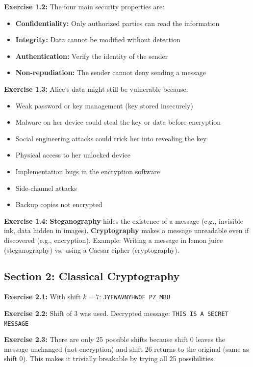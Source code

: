 \documentclass[11pt,a4paper]{report}
\begin{document}
\textbf{Exercise 1.2:}
The four main security properties are:
\begin{itemize}
    \item \textbf{Confidentiality:} Only authorized parties can read the information
    \item \textbf{Integrity:} Data cannot be modified without detection
    \item \textbf{Authentication:} Verify the identity of the sender
    \item \textbf{Non-repudiation:} The sender cannot deny sending a message
\end{itemize}

\textbf{Exercise 1.3:}
Alice's data might still be vulnerable because:
\begin{itemize}
    \item Weak password or key management (key stored insecurely)
    \item Malware on her device could steal the key or data before encryption
    \item Social engineering attacks could trick her into revealing the key
    \item Physical access to her unlocked device
    \item Implementation bugs in the encryption software
    \item Side-channel attacks
    \item Backup copies not encrypted
\end{itemize}

\textbf{Exercise 1.4:}
\textbf{Steganography} hides the existence of a message (e.g., invisible ink, data hidden in images). \textbf{Cryptography} makes a message unreadable even if discovered (e.g., encryption). Example: Writing a message in lemon juice (steganography) vs. using a Caesar cipher (cryptography).

\subsection*{Section 2: Classical Cryptography}

\textbf{Exercise 2.1:}
With shift $k=7$: \texttt{JYFWAVNYHWOF PZ MBU}

\textbf{Exercise 2.2:}
Shift of 3 was used. Decrypted message: \texttt{THIS IS A SECRET MESSAGE}

\textbf{Exercise 2.3:}
There are only 25 possible shifts because shift 0 leaves the message unchanged (not encryption) and shift 26 returns to the original (same as shift 0). This makes it trivially breakable by trying all 25 possibilities.
\end{document}
